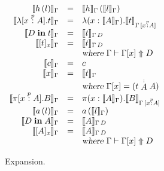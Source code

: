 \begin{figure}
\begin{center}
\begin{math}
\begin{array}{rclr}

\llbracket h\,(l) \rrbracket_{\Gamma}
&=& 
\llbracket h \rrbracket_{\Gamma}\,(\llbracket l \rrbracket_{\Gamma}) 
\\
\llbracket \lambda [x \stackrel{p}{:} A]. t \rrbracket_{\Gamma}
&=&
\lambda (x : \llbracket A \rrbracket_{\Gamma}). \llbracket t \rrbracket_{\Gamma \, [x \stackrel{p}{:} A]}
\\
\llbracket D \;\textbf{in}\; t \rrbracket_{\Gamma}
&=&
\llbracket t \rrbracket_{\Gamma \, D}
\\
\llbracket [ t ]_{x} \rrbracket_{\Gamma}
&=&
\llbracket t \rrbracket_{\Gamma \, D} \\
&&\textsl{where } \Gamma \vdash \Gamma[x] \Uparrow D
\\
\llbracket c \rrbracket_{\Gamma} 
&=&
c
\\
\llbracket x \rrbracket_{\Gamma} 
&=&
\llbracket t \rrbracket_{\Gamma} \\
&& \textsl{where } \Gamma[x] = (t \stackrel{:}{A} A)
\\
\llbracket \pi [x \stackrel{p}{:} A]. B \rrbracket_{\Gamma}
&=&
\pi (x : \llbracket A \rrbracket_{\Gamma}). \llbracket B \rrbracket_{\Gamma \, [x \stackrel{p}{:} A]}
\\
\llbracket a\,(l) \rrbracket_{\Gamma}
&=&
a\,(\llbracket l \rrbracket_{\Gamma}) 
\\
\llbracket D \;\textbf{in}\; A \rrbracket_{\Gamma}
&=&
\llbracket A \rrbracket_{\Gamma \, D}
\\
\llbracket [ A ]_{x} \rrbracket_{\Gamma}
&=&
\llbracket A \rrbracket_{\Gamma \, D}\\
&&\textsl{where } \Gamma \vdash \Gamma[x] \Uparrow D
\\
\end{array}
\end{math}
\end{center}
\caption{Expansion.}
\label{fig:expansion}
\end{figure}
